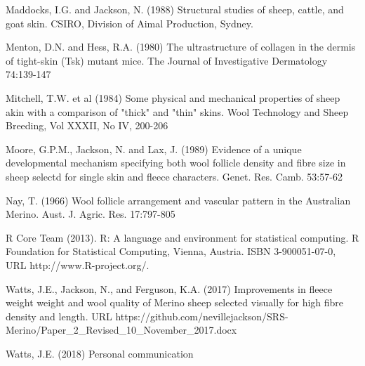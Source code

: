 \documentclass[titlepage]{article}  %
\begin{document}
\begin{thebibliography}{99}
Maddocks, I.G. and Jackson, N. (1988) Structural studies of sheep, cattle, and goat skin. CSIRO, Division of Aimal Production, Sydney.

Menton, D.N. and Hess, R.A. (1980) The ultrastructure of collagen in the dermis of tight-skin (Tsk) mutant mice. The Journal of Investigative Dermatology 74:139-147

Mitchell, T.W. et al (1984) Some physical and mechanical properties of sheep akin with a comparison of "thick" and "thin" skins. Wool Technology and Sheep Breeding, Vol XXXII, No IV, 200-206

Moore, G.P.M., Jackson, N. and Lax, J. (1989) Evidence of a unique developmental mechanism specifying both wool follicle density and fibre size in sheep selectd for single skin and fleece characters. Genet. Res. Camb. 53:57-62

Nay, T. (1966) Wool follicle arrangement and vascular pattern in the Australian Merino. Aust. J. Agric. Res. 17:797-805

R Core Team (2013). R: A language and environment for statistical
  computing. R Foundation for Statistical Computing, Vienna, Austria.
  ISBN 3-900051-07-0, URL http://www.R-project.org/.


Watts, J.E., Jackson, N., and Ferguson, K.A. (2017) Improvements in fleece weight weight and wool quality of Merino sheep selected visually for high fibre density and length. URL https://github.com/nevillejackson/SRS-Merino/Paper\_2\_Revised\_10\_November\_2017.docx 

Watts, J.E. (2018) Personal communication

\end{thebibliography}
\end{document}
